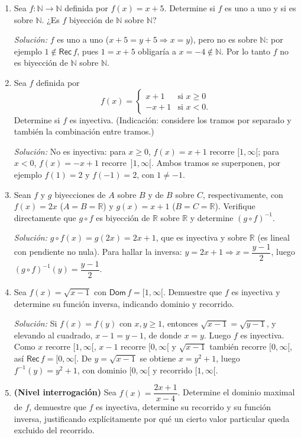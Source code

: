 \documentclass[11pt]{article}
\begin{document}
\begin{enumerate}[label=\arabic*.]
\item Sea $f:\mathbb{N}\to\mathbb{N}$ definida por $f(x) = x+5$. Determine si
$f$ es uno a uno y si es sobre $\mathbb{N}$. ¿Es $f$ biyección de $\mathbb{N}$
sobre $\mathbb{N}$?

\textit{Solución:} $f$ es uno a uno ($x+5=y+5\Rightarrow x=y$), pero no es sobre $\mathbb{N}$: por
ejemplo $1\notin\mathsf{Rec}\,f$, pues $1=x+5$ obligaría a $x=-4\notin\mathbb{N}$. Por lo tanto $f$
no es biyección de $\mathbb{N}$ sobre $\mathbb{N}$.

\item Sea $f$ definida por
\[
f(x) = \begin{cases} x+1 & \text{si } x \ge 0 \\ -x+1 & \text{si } x < 0. \end{cases}
\]
Determine si $f$ es inyectiva. (Indicación: considere los tramos por
separado y también la combinación entre tramos.)

\textit{Solución:} No es inyectiva: para $x\ge0$, $f(x)=x+1$ recorre $[1,\infty[$; para $x<0$,
$f(x)=-x+1$ recorre $\,]1,\infty[$. Ambos tramos se superponen, por ejemplo $f(1)=2$ y $f(-1)=2$,
con $1\neq-1$.

\item Sean $f$ y $g$ biyecciones de $A$ sobre $B$ y de $B$ sobre $C$,
respectivamente, con $f(x) = 2x$ ($A=B=\mathbb{R}$) y $g(x) = x+1$
($B=C=\mathbb{R}$). Verifique directamente que $g\circ f$ es biyección de
$\mathbb{R}$ sobre $\mathbb{R}$ y determine $(g\circ f)^{-1}$.

\textit{Solución:} $g\circ f(x) = g(2x) = 2x+1$, que es inyectiva y sobre $\mathbb{R}$ (es lineal
con pendiente no nula). Para hallar la inversa: $y=2x+1 \Rightarrow x=\dfrac{y-1}{2}$, luego
$(g\circ f)^{-1}(y) = \dfrac{y-1}{2}$.

\item Sea $f(x) = \sqrt{x-1}$ con $\mathsf{Dom}\,f = [1,\infty[$. Demuestre que
$f$ es inyectiva y determine su función inversa, indicando dominio y
recorrido.

\textit{Solución:} Si $f(x)=f(y)$ con $x,y\ge1$, entonces $\sqrt{x-1}=\sqrt{y-1}$, y elevando al
cuadrado, $x-1=y-1$, de donde $x=y$. Luego $f$ es inyectiva. Como $x$ recorre $[1,\infty[$, $x-1$
recorre $[0,\infty[$ y $\sqrt{x-1}$ también recorre $[0,\infty[$, así $\mathsf{Rec}\,f=[0,\infty[$.
De $y=\sqrt{x-1}$ se obtiene $x=y^2+1$, luego $f^{-1}(y)=y^2+1$, con dominio $[0,\infty[$ y
recorrido $[1,\infty[$.

\item \textbf{(Nivel interrogación)} Sea $f(x) = \dfrac{2x+1}{x-4}$. Determine el dominio maximal
de $f$, demuestre que $f$ es inyectiva, determine su recorrido y su función inversa, justificando
explícitamente por qué un cierto valor particular queda excluido del recorrido.


\end{enumerate}
\end{document}
